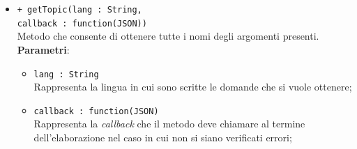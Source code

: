 \begin{itemize}
\begin{itemize}
			\item \texttt{+ getTopic(lang : String,\\callback : function(JSON))} \\
			Metodo che consente di ottenere tutte i nomi degli argomenti presenti. \\
			\textbf{Parametri}:
			\begin{itemize}
				\item \texttt{lang : String} \\
				Rappresenta la lingua in cui sono scritte le domande che si vuole ottenere;
				\item \texttt{callback : function(JSON)} \\
				Rappresenta la \textit{callback} che il metodo deve chiamare al termine dell'elaborazione nel caso in cui non si siano verificati errori;
			\end{itemize}
			

\end{itemize}
\end{itemize}
